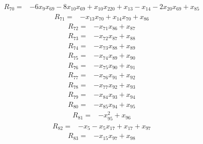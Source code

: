 \[
\begin{aligned}
R_{70}={}&-6x_{9}x_{69}-8x_{10}x_{69}+x_{10}x_{220}+x_{13}-x_{14}-2x_{20}x_{69}+x_{85}
\end{aligned}
\]
\[
\begin{aligned}
R_{71}={}&-x_{13}x_{70}+x_{14}x_{70}+x_{86}
\end{aligned}
\]
\[
\begin{aligned}
R_{72}={}&-x_{71}x_{86}+x_{87}
\end{aligned}
\]
\[
\begin{aligned}
R_{73}={}&-x_{72}x_{87}+x_{88}
\end{aligned}
\]
\[
\begin{aligned}
R_{74}={}&-x_{73}x_{88}+x_{89}
\end{aligned}
\]
\[
\begin{aligned}
R_{75}={}&-x_{74}x_{89}+x_{90}
\end{aligned}
\]
\[
\begin{aligned}
R_{76}={}&-x_{75}x_{90}+x_{91}
\end{aligned}
\]
\[
\begin{aligned}
R_{77}={}&-x_{76}x_{91}+x_{92}
\end{aligned}
\]
\[
\begin{aligned}
R_{78}={}&-x_{77}x_{92}+x_{93}
\end{aligned}
\]
\[
\begin{aligned}
R_{79}={}&-x_{84}x_{93}+x_{94}
\end{aligned}
\]
\[
\begin{aligned}
R_{80}={}&-x_{85}x_{94}+x_{95}
\end{aligned}
\]
\[
\begin{aligned}
R_{81}={}&-x_{95}^{2}+x_{96}
\end{aligned}
\]
\[
\begin{aligned}
R_{82}={}&-x_{5}-x_{5}x_{17}+x_{17}+x_{97}
\end{aligned}
\]
\[
\begin{aligned}
R_{83}={}&-x_{15}x_{97}+x_{98}
\end{aligned}
\]
